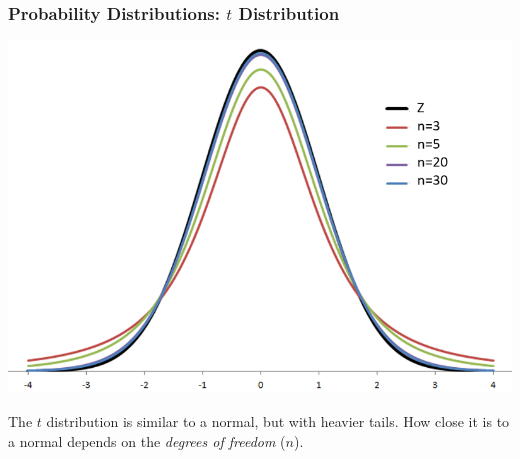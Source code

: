 \documentclass[12pt, 
hyperref={colorlinks=true, linkcolor=blue, urlcolor=cyan}]{beamer}
\begin{document}
\begin{frame}
\frametitle{Probability Distributions: $t$ Distribution}

\begin{center} \includegraphics[height=0.6\textheight]{./t-normal}  \end{center}

\vspace{-0.4cm} \begin{small} The $t$ distribution is similar to a normal, but with heavier tails. How close it is to a normal depends on the \textit{degrees of freedom} ($n$). \end{small}

\end{frame}
\end{document}
